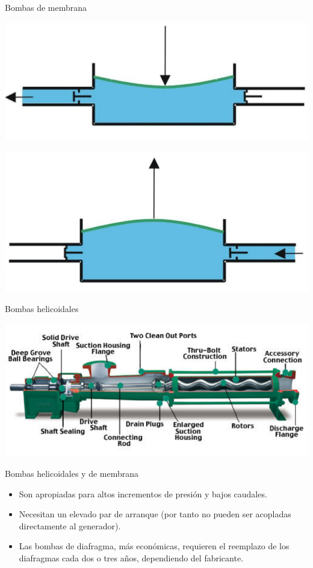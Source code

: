 \documentclass[xcolor={usenames,svgnames,dvipsnames}]{beamer}
\begin{document}
\begin{frame}[label={sec:org1198a2b}]{Bombas de membrana}
\begin{center}
\includegraphics[width=.9\linewidth]{../figs/800px-Bomba_diafragma_impulsando.pdf}
\end{center}

\begin{center}
\includegraphics[width=.9\linewidth]{../figs/Bomba_diafragma_aspirando.pdf}
\end{center}
\end{frame}

\begin{frame}[label={sec:orgca205e9}]{Bombas helicoidales}
\begin{center}
\includegraphics[width=.9\linewidth]{../figs/bombatornillo.pdf}
\end{center}
\end{frame}

\begin{frame}[label={sec:orga7cb841}]{Bombas helicoidales y de membrana}
\begin{itemize}
\item Son apropiadas para \alert{altos incrementos de presión y bajos caudales}.

\item Necesitan un \alert{elevado par de arranque} (por tanto no pueden ser acopladas directamente al generador).

\item Las bombas de diafragma, más económicas, requieren el \alert{reemplazo de los diafragmas} cada dos o tres años, dependiendo del fabricante.
\end{itemize}
\end{frame}
\end{document}
